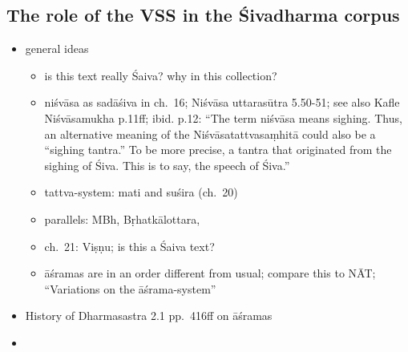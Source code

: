 \documentclass[11pt]{book}
\begin{document}
\subsection{The role of the VSS in the Śivadharma corpus}

\begin{itemize}
\item
  general ideas

  \begin{itemize}
  
  \item
    is this text really Śaiva? why in this collection?
  \item
    niśvāsa as sadāśiva in ch.~16; Niśvāsa uttarasūtra 5.50-51; see also
    Kafle Niśvāsamukha p.11ff; ibid. p.12: ``The term niśvāsa means
    sighing. Thus, an alternative meaning of the Niśvāsatattvasaṃhitā
    could also be a ``sighing tantra.'' To be more precise, a tantra
    that originated from the sighing of Śiva. This is to say, the speech
    of Śiva.''
  \item
    tattva-system: mati and suśira (ch.~20)
  \item
    parallels: MBh, Bṛhatkālottara,
  \item
    ch.~21: Viṣṇu; is this a Śaiva text?
  \item
    āśramas are in an order different from usual; compare this to NĀT;
    ``Variations on the āśrama-system''
  \end{itemize}
\item
  History of Dharmasastra 2.1 pp.~416ff on āśramas
\item
  \begin{enumerate}
  \def\labelenumi{\alph{enumi}.}
  \setcounter{enumi}{13}
  

\end{enumerate}
\end{itemize}
\end{document}
